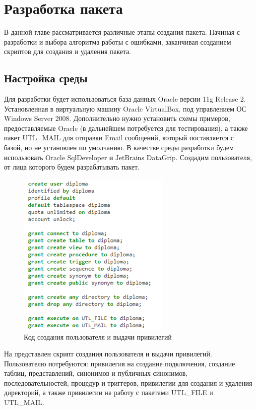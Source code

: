 \chapter{Разработка пакета} \label{ch3}

В данной главе рассматривается различные этапы создания пакета. Начиная с разработки и выбора алгоритма работы с ошибками, заканчивая созданием скриптов для создания и удаления пакета.

 
\section{Настройка среды} \label{ch3:sec1}

Для разработки будет использоваться база данных Oracle версии 11g Release 2. Установленная в виртуальную машину Oracle VirtualBox, под управлением ОС Windows Server 2008. Дополнительно нужно установить схемы примеров, предоставляемые Oracle (в дальнейшем потребуется для тестирования), а также пакет UTL\_MAIL для отправки Email сообщений, который поставляется с базой, но не установлен по умолчанию. В качестве среды разработки будем использовать Oracle SqlDeveloper и JetBrains DataGrip. Создадим пользователя, от лица которого будем разрабатывать пакет. 

\begin{figure}[ht!] 
	\center
	\includegraphics [scale=1] {my_folder/img/C3_create_user.png}
	\caption{Код создания пользователя и выдачи привилегий} 
	\label{fig:C3_create_user}  
\end{figure}
\FloatBarrier

На  представлен скрипт создания пользователя и выдачи привилегий. Пользователю потребуются: привилегия на создание подключения, создание таблиц, представлений, синонимов и публичных синонимов, последовательностей, процедур и триггеров, привилегии для создания и удаления директорий, а также привилегии на работу с пакетами UTL\_FILE и UTL\_MAIL. 

